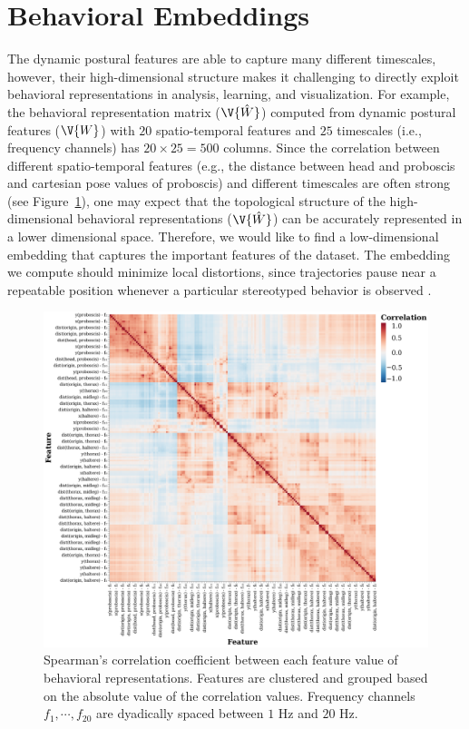 \section{Behavioral Embeddings}\label{section:behavioral-embeddings}
The dynamic postural features are able to capture many different timescales, however, their high-dimensional structure makes it challenging to directly exploit behavioral representations in analysis, learning, and visualization.
For example, the behavioral representation matrix ($\V{\hat{W}}$) computed from dynamic postural features ($\V{W}$) with $20$ spatio-temporal features and $25$ timescales (i.e., frequency channels) has $20 \times 25 {=} 500$ columns.
Since the correlation between different spatio-temporal features (e.g., the distance between head and proboscis and cartesian pose values of proboscis) and different timescales are often strong (see Figure~\ref{figure:correlations-btw-features}), one may expect that the topological structure of the high-dimensional behavioral representations ($\V{\hat{W}}$) can be accurately represented in a lower dimensional space.
Therefore, we would like to find a low-dimensional embedding that captures the important features of the dataset.
The embedding we compute should minimize local distortions, since trajectories pause near a repeatable position whenever a particular stereotyped behavior is observed \citep{berman_mapping_2014, deangelis_manifold_2019, ali_timecluster_2019}.

\begin{figure}[ht!]
	\centering
	\includegraphics[width=0.70\linewidth]{figures/FeatureCorrelations-FlyF1DAnn-XY_labels.pdf}
	\caption[Spearman's correlation coefficient between each feature value of behavioral representations.]{Spearman's correlation coefficient between each feature value of behavioral representations. Features are clustered and grouped based on the absolute value of the correlation values. Frequency channels $f_1, \cdots, f_{20}$ are dyadically spaced between $1$ Hz and $20$ Hz. \label{figure:correlations-btw-features}}
\end{figure}

